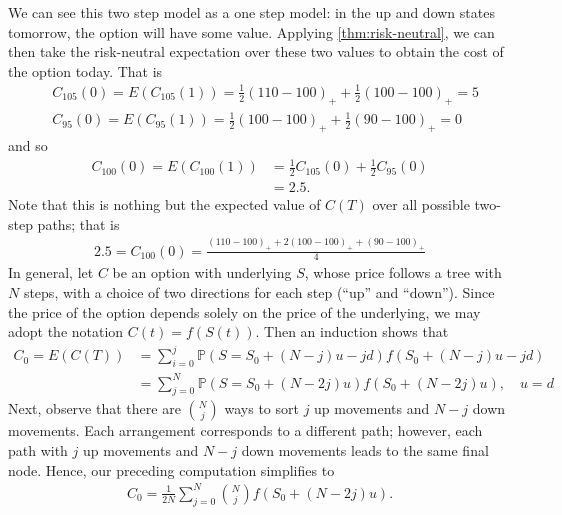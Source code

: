 \documentclass[12pt]{article}
\newcommand{\prob}{\mathbb{P}}
\theoremstyle{plain}
\theoremstyle{definition}
\theoremstyle{remark}
\numberwithin{equation}{section}  %
\begin{document}
	We can see this two step model as a one step model: in the up and down states
	tomorrow, the option will have some value. Applying 
	\cref{thm:risk-neutral}, we can then take the risk-neutral 
	expectation over these two values to obtain the cost of the option today.
	That is
	\begin{equation*}
		\begin{split}
			& C_{105}(0) = E(C_{105}(1)) = \frac{1}{2}{(110 - 100)}_{+} +
			\frac{1}{2}{(100 - 100)}_{+} = 5
			\\
			& C_{95}(0) = E(C_{95}(1)) = \frac{1}{2}{(100 - 100)}_{+} +
			\frac{1}{2}{(90 - 100)}_{+} = 0
		\end{split}
	\end{equation*}
	and so
	\begin{equation*}
		\begin{split}
			C_{100}(0) = E(C_{100}(1))
			& = \frac{1}{2}C_{105}(0) + \frac{1}{2} C_{95}(0)
			\\
			& = 2.5.
		\end{split}
	\end{equation*}
	Note that this is nothing but the expected value
	of $C(T)$ over all possible two-step paths; that is
	\begin{equation*}
		\begin{split}
			2.5 = C_{100}(0) = \frac{{(110-100)}_{+} + 2 {(100 - 100)}_{+} + {(90 - 100)}_{+}}{4}
		\end{split}
	\end{equation*}
	In general, let $C$ be an option with underlying $S$, whose price follows
	a tree with $N$ steps, with a choice of two
	directions for each step (``up'' and ``down'').
	Since the price of the option depends solely on the price of the
	underlying, we may adopt the notation $C(t) = f(S(t))$. Then
	an induction shows that
	\begin{equation*}
		\begin{split}
			C_{0} = E(C(T)) & =  \sum_{i = 0}^{j}\prob(S = S_{0} + (N-j)u - jd)
			f(S_{0} + (N-j)u - jd)
			\\
			& = \sum_{j = 0}^{N}\prob(S = S_{0} + (N-2j)u)
			f(S_{0} + (N-2j)u), \quad u = d
		\end{split}
	\end{equation*}
	Next, observe that there are $N \choose j$ ways to sort $j$ up movements and
	$N-j$ down movements. Each arrangement corresponds to a different path; however,
	each path with $j$ up movements and $N-j$ down movements leads to the same final
	node. Hence, our preceding computation simplifies to
	\begin{equation*}
		\begin{split}
			C_{0} = 	\frac{1}{2N} \sum_{j = 0}^{N} {N \choose j}f(S_{0} + (N-2j)u).
		\end{split}
	\end{equation*}
\end{document}
